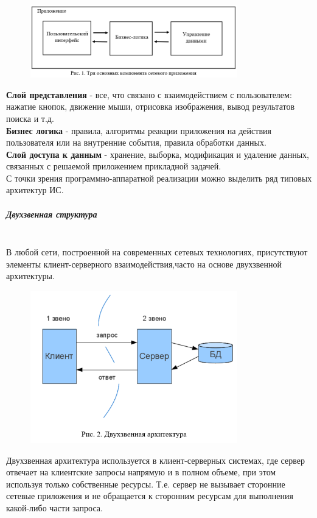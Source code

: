\begin{figure}[h!]
    \centering
    \includegraphics[width=0.8\textwidth]{assets/661}
\end{figure}

\textbf{Слой представления} - все, что связано с взаимодействием с пользователем: нажатие кнопок,
движение мыши, отрисовка изображения, вывод результатов поиска и т.д.~\\
\textbf{Бизнес логика} - правила, алгоритмы реакции приложения на действия пользователя или на
внутренние события, правила обработки данных.~\\
\textbf{Слой доступа к данным} - хранение, выборка, модификация и удаление данных, связанных
с решаемой приложением прикладной задачей.~\\
С точки зрения программно-аппаратной реализации можно выделить ряд типовых
архитектур ИС.

\subparagraph{Двухзвенная структура}~\\
В любой сети, построенной на современных сетевых технологиях, присутствуют элементы
клиент-серверного взаимодействия,часто на основе двухзвенной архитектуры.

\begin{figure}[h!]
    \centering
    \includegraphics[width=0.8\textwidth]{assets/662}
\end{figure}

Двухзвенная архитектура используется в клиент-серверных системах, где сервер отвечает
на клиентские запросы напрямую и в полном объеме, при этом используя только
собственные ресурсы. Т.е. сервер не вызывает сторонние сетевые приложения и не
обращается к сторонним ресурсам для выполнения какой-либо части запроса.

